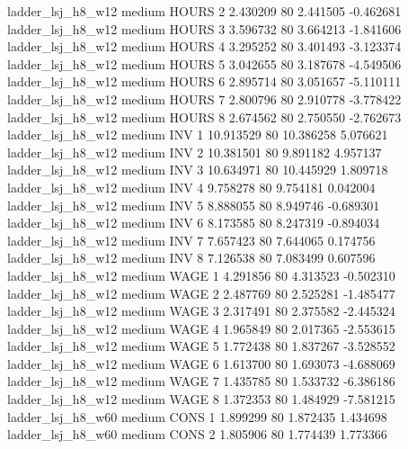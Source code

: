   ladder_lsj_h8_w12     medium    HOURS                 2  2.430209 80       2.441505          -0.462681
  ladder_lsj_h8_w12     medium    HOURS                 3  3.596732 80       3.664213          -1.841606
  ladder_lsj_h8_w12     medium    HOURS                 4  3.295252 80       3.401493          -3.123374
  ladder_lsj_h8_w12     medium    HOURS                 5  3.042655 80       3.187678          -4.549506
  ladder_lsj_h8_w12     medium    HOURS                 6  2.895714 80       3.051657          -5.110111
  ladder_lsj_h8_w12     medium    HOURS                 7  2.800796 80       2.910778          -3.778422
  ladder_lsj_h8_w12     medium    HOURS                 8  2.674562 80       2.750550          -2.762673
  ladder_lsj_h8_w12     medium      INV                 1 10.913529 80      10.386258           5.076621
  ladder_lsj_h8_w12     medium      INV                 2 10.381501 80       9.891182           4.957137
  ladder_lsj_h8_w12     medium      INV                 3 10.634971 80      10.445929           1.809718
  ladder_lsj_h8_w12     medium      INV                 4  9.758278 80       9.754181           0.042004
  ladder_lsj_h8_w12     medium      INV                 5  8.888055 80       8.949746          -0.689301
  ladder_lsj_h8_w12     medium      INV                 6  8.173585 80       8.247319          -0.894034
  ladder_lsj_h8_w12     medium      INV                 7  7.657423 80       7.644065           0.174756
  ladder_lsj_h8_w12     medium      INV                 8  7.126538 80       7.083499           0.607596
  ladder_lsj_h8_w12     medium     WAGE                 1  4.291856 80       4.313523          -0.502310
  ladder_lsj_h8_w12     medium     WAGE                 2  2.487769 80       2.525281          -1.485477
  ladder_lsj_h8_w12     medium     WAGE                 3  2.317491 80       2.375582          -2.445324
  ladder_lsj_h8_w12     medium     WAGE                 4  1.965849 80       2.017365          -2.553615
  ladder_lsj_h8_w12     medium     WAGE                 5  1.772438 80       1.837267          -3.528552
  ladder_lsj_h8_w12     medium     WAGE                 6  1.613700 80       1.693073          -4.688069
  ladder_lsj_h8_w12     medium     WAGE                 7  1.435785 80       1.533732          -6.386186
  ladder_lsj_h8_w12     medium     WAGE                 8  1.372353 80       1.484929          -7.581215
  ladder_lsj_h8_w60     medium     CONS                 1  1.899299 80       1.872435           1.434698
  ladder_lsj_h8_w60     medium     CONS                 2  1.805906 80       1.774439           1.773366
